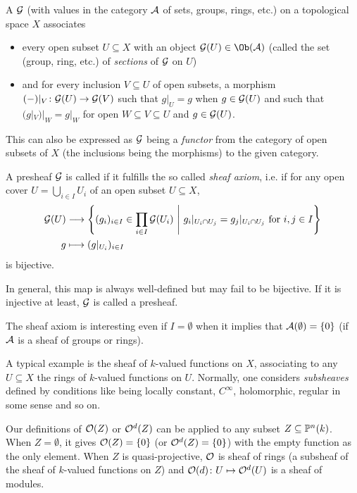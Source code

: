 \documentclass[a4paper,parskip=half,numbers=enddot, DIV=12]{scrreprt}
\begin{document}
\begin{defi}[Presheaf]
    A  $\mathcal{G}$ (with values in the category $\mathcal{A}$ of sets, groups, rings, etc.) on a topological space $X$ associates
    \begin{itemize}
    	\item every open subset $U\subseteq X$ with an object $\Gg(U)\in\Ob(\Aa)$ (called the set (group, ring, etc.) of \emph{sections} of $\mathcal{G}$ on  $U$)
    	\item and for every inclusion $V\subseteq U$ of open subsets, a morphism $(-)|_V\colon \Gg(U)\morphism \Gg(V)$ such that $g|_U = g$ when $g\in \mathcal{G}(U)$ and such that $(g|_V)|_W = g|_W$ for open $W\subseteq V\subseteq U$ and $g\in \mathcal{G}(U)$. 
    \end{itemize}
    This can also be expressed as $\mathcal{G}$ being a \emph{functor} from the category of open subsets of $X$ (the inclusions being the morphisms) to the given category.
\end{defi}

\begin{defi}[Sheaf]
    A presheaf $\mathcal{G}$ is called  if it fulfills the so called \emph{sheaf axiom}, i.e. if for any open cover $U = \bigcup_{i\in I} U_i$ of an open subset $U\subseteq X$,
    \begin{align*}
        \Gg(U) &\morphism \left\{(g_i)_{i\in I}\in \prod_{i\in I} \Gg(U_i)\st g_i|_{U_i\cap U_j} = g_j|_{U_i\cap U_j} \text{ for } i,j\in I\right\}\\
        g& \longmapsto (g|_{U_i})_{i\in I}
    \end{align*}
    is bijective. 
    
    In general, this map is always well-defined but may fail to be bijective. If it is injective at least, $\mathcal{G}$ is called a  presheaf.
\end{defi}
\begin{rem}
    \begin{alphanumerate}
        \item 
            The sheaf axiom is interesting even if $I=\emptyset$ when it implies that $\mathcal{A}(\emptyset) = \{0\}$ (if $\mathcal{A}$ is a sheaf of groups or rings).
        \item
            A typical example is the sheaf of $k$-valued functions on $X$, associating to any $U\subseteq X$ the rings of $k$-valued functions on $U$. Normally, one considers \emph{subsheaves} defined by conditions like being locally constant, $C^\infty$, holomorphic, regular in some sense and so on.
        \item 
            Our definitions of $\mathcal{O}(Z)$ or $\mathcal{O}^d(Z)$ can be applied to any subset $Z\subseteq \mathbb{P}^n(k)$. When $Z=\emptyset$, it gives $\mathcal{O}(Z) = \{0\}$ (or $\mathcal{O}^d(Z) = \{0\}$) with the empty function as the only element. When $Z$ is quasi-projective, $\mathcal{O}$ is sheaf of rings (a subsheaf of the sheaf of $k$-valued functions on $Z$) and $\mathcal{O}(d)\colon U\mapsto \mathcal{O}^d(U)$ is a sheaf of modules.
    \end{alphanumerate}
\end{rem}
\end{document}
